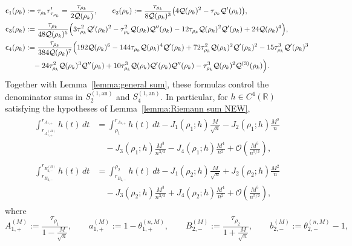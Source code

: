 \documentclass[a4paper]{article}
\numberwithin{equation}{section}
\begin{document}
\begin{align*}
 \mathsf{c}_1(\rho_k)&:=\tau_{\rho_k}r_{\tau_{\rho_k}}'= \frac{\tau_{\rho_k}}{2\mathcal{Q}(\rho_k)},\qquad
\mathsf{c}_2(\rho_k):=\frac{\tau_{\rho_k}}{8\mathcal{Q}(\rho_k)^3}\bigl(4\mathcal{Q}(\rho_k)^2-\tau_{\rho_k}\mathcal{Q}'(\rho_k)\bigr),
\\
\mathsf{c}_3(\rho_k)&:=\frac{\tau_{\rho_k}}{48\mathcal{Q}(\rho_k)^5}
\Bigl( 
3\tau_{\rho_k}^2\mathcal{Q}'(\rho_k)^2-\tau_{\rho_k}^2\mathcal{Q}(\rho_k)\mathcal{Q}''(\rho_k)
-12\tau_{\rho_k}\mathcal{Q}(\rho_k)^2\mathcal{Q}'(\rho_k)+24\mathcal{Q}(\rho_k)^4
\Bigr), 
\\
\mathsf{c}_4(\rho_k)&:=
 \frac{\tau_{\rho_k}}{384\mathcal{Q}(\rho_k)^7}
 \Bigl( 
 192\mathcal{Q}(\rho_k)^6-144\tau_{\rho_k}\mathcal{Q}(\rho_k)^4\mathcal{Q}'(\rho_k)+72\tau_{\rho_k}^2\mathcal{Q}(\rho_k)^2\mathcal{Q}'(\rho_k)^2
 -15\tau_{\rho_k}^3\mathcal{Q}'(\rho_k)^3
 \\
 &\quad 
 -24\tau_{\rho_k}^2\mathcal{Q}(\rho_k)^3\mathcal{Q}''(\rho_k)
 +10\tau_{\rho_k}^3\mathcal{Q}(\rho_k)\mathcal{Q}'(\rho_k)\mathcal{Q}''(\rho_k)-\tau_{\rho_k}^3\mathcal{Q}(\rho_k)^2\mathcal{Q}^{(3)}(\rho_k)
 \Bigr).     
\end{align*}
Together with Lemma~\ref{lemma:general sum}, these formulas control the denominator sums in $S_2^{(1,\mathrm{an})}$ and $S_4^{(1,\mathrm{an})}$. In particular, for $h\in C^4(\mathbb R)$ satisfying the hypotheses of Lemma~\ref{lemma:Riemann sum NEW},
\begin{align}
\begin{split}
\label{def of ht expansion A1+AM}
\int_{r_{A_{1,+}^{(M)}}}^{r_{A_{1,+}}}
h(t)\,dt
&=
\int_{\rho_1}^{r_{A_{1,+}}}h(t)\,dt
-J_1(\rho_1;h)\frac{M}{\sqrt{n}}
-J_2(\rho_1;h)\frac{M^2}{n}
\\
&\quad
-J_3(\rho_1;h)\frac{M^3}{n^{3/2}}
-J_4(\rho_1;h)\frac{M^4}{n^2}
+\mathcal{O}(\frac{M^5}{n^{5/2}}),
\end{split}
\\
\begin{split}
\label{def of ht expansion B2-BM}
\int_{r_{B_{2,-}}}^{r_{B_{2,-}^{(M)}}}
h(t)\,dt
&=
\int_{r_{B_{2,-}}}^{\rho_2}h(t)\,dt
-J_1(\rho_2;h)\frac{M}{\sqrt{n}}
+
J_2(\rho_2;h)\frac{M^2}{n}
\\
&\quad
-J_3(\rho_2;h)\frac{M^3}{n^{3/2}}
+J_4(\rho_2;h)\frac{M^4}{n^2}
+\mathcal{O}(\frac{M^5}{n^{5/2}}),
\end{split}
\end{align}
where 
\begin{equation}
\label{def of parameters A1M B2M}
    A_{1,+}^{(M)}:=\frac{\tau_{\rho_1}}{1-\frac{M}{\sqrt{n}}},\qquad a_{1,+}^{(M)}:=1-\theta_{1,+}^{(n,M)},\qquad B_{2,-}^{(M)}:=\frac{\tau_{\rho_2}}{1+\frac{M}{\sqrt{n}}},\qquad b_{2,-}^{(M)}:=\theta_{2,-}^{(n,M)}-1,
\end{equation}
\end{document}
